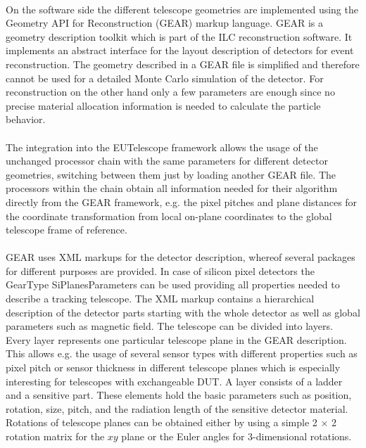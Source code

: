 \documentclass[11pt]{article}
\begin{document}
\paragraph{}
On the software side the different telescope geometries are implemented using the Geometry API for Reconstruction (GEAR) markup language. GEAR is a geometry description toolkit which is part of the ILC reconstruction software. It implements an abstract interface for the layout description of detectors for event reconstruction. The geometry described in a GEAR file is simplified and therefore cannot be used for a detailed Monte Carlo simulation of the detector. For reconstruction on the other hand only a few parameters are enough since no precise material allocation information is needed to calculate the particle behavior.
\paragraph{}
The integration into the EUTelescope framework allows the usage of the unchanged processor chain with the same parameters for different detector geometries, switching between them just by loading another GEAR file. The processors within the chain obtain all information needed for their algorithm directly from the GEAR framework, e.g. the pixel pitches and plane distances for the coordinate transformation from local on-plane coordinates to the global telescope frame of reference.
\paragraph{}
GEAR uses XML markups for the detector description, whereof several packages for different purposes are provided. In case of silicon pixel detectors the GearType SiPlanesParameters can be used providing all properties needed to describe a tracking telescope. The XML markup contains a hierarchical description of the detector parts starting with the whole detector as well as global parameters such as magnetic field. The telescope can be divided into layers. Every layer represents one particular telescope plane in the GEAR description. This allows e.g. the usage of several sensor types with different properties such as pixel pitch or sensor thickness in different telescope planes which is especially interesting for telescopes with exchangeable DUT. A layer consists of a ladder and a sensitive part. These elements hold the basic parameters such as position, rotation, size, pitch, and the radiation length of the sensitive detector material. Rotations of telescope planes can be obtained either by using a simple 2 × 2 rotation matrix for the $xy$ plane or the Euler angles for 3-dimensional rotations.
\end{document}
